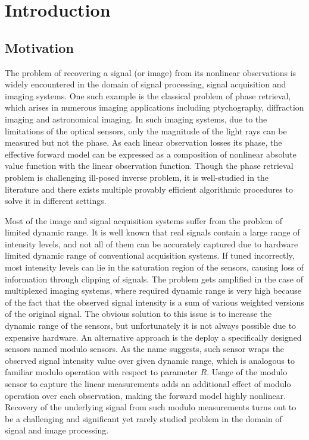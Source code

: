 \section{Introduction}
\label{sec:intro}
\subsection{Motivation}
The problem of recovering a signal (or image) from its nonlinear observations is widely encountered in the domain of signal processing, signal acquisition and imaging systems. One such example is the classical problem of phase retrieval, which arises in numerous imaging applications including ptychography, diffraction imaging and astronomical imaging. In such imaging systems, due to the limitations of the optical sensors, only the magnitude of the light rays can be measured but not the phase. As each linear observation losses its phase, the effective forward model can be expressed as a composition of nonlinear absolute value function with the linear observation function. Though the phase retrieval problem is challenging ill-posed inverse problem, it is well-studied in the literature and there exists multiple provably efficient algorithmic procedures to solve it in different settings. \cite{}

Most of the image and signal acquisition systems suffer from the problem of limited dynamic range. It is well known that real signals contain a large range of intensity levels, and not all of them can be accurately captured due to hardware limited dynamic range of conventional acquisition systems. If tuned incorrectly, most intensity levels can lie in the saturation region of the sensors, causing loss of information through clipping of signals. The problem gets amplified in the case of multiplexed imaging systems, where required dynamic range is very high because of the fact that the observed signal intensity is a sum of various weighted versions of the original signal. The obvious solution to this issue is to increase the dynamic range of the sensors, but unfortunately it is not always possible due to expensive hardware. An alternative approach is the deploy a specifically designed sensors named modulo sensors. As the name suggests, such sensor wraps the observed signal intensity value over given dynamic range, which is analogous to familiar modulo operation with respect to parameter $R$. Usage of the modulo sensor to capture the linear measurements adds an additional effect of modulo operation over each observation, making the forward model highly nonlinear. Recovery of the underlying signal from such modulo measurements turns out to be a challenging and significant yet rarely studied problem in the domain of signal and image processing. 

